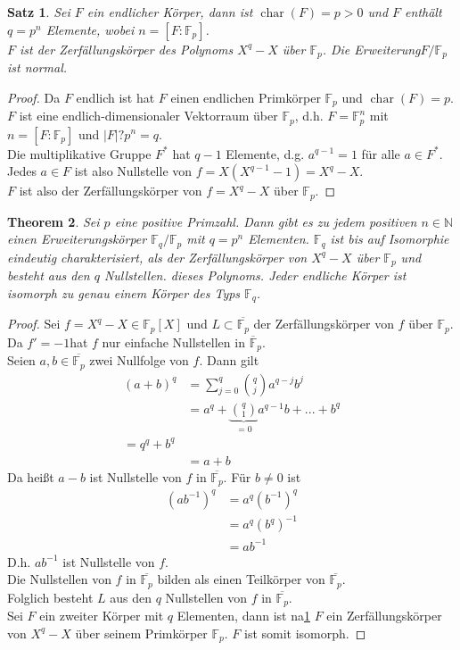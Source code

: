 \documentclass[10pt,a4paper]{article}
\newcommand{\N}{\ensuremath{\mathbb{N}}}
\newcommand{\F}{\ensuremath{\mathbb{F}}}
\newcommand{\ol}[1]{\overline{#1}}
\newcommand{\abs}[1]{\left|#1\right|}
\newcommand{\cha}{\operatorname{char}}
\theoremstyle{plain}
\newtheorem{theorem}{Theorem}[section]
\newtheorem{satz}[theorem]{Satz}
\theoremstyle{definition}
\theoremstyle{remark}
\begin{document}
	\begin{satz}\label{satz:primErweitEigenschaften}
		Sei $F$ ein endlicher Körper, dann ist $\cha(F)=p>0$ und $F$ enthält $q=p^n$ Elemente, wobei $n=[F:\F_p]$.\\
		$F$ ist der Zerfällungskörper des Polynoms $X^q-X$ über $\F_p$. Die Erweiterung$F/\F_p$ ist normal.
	\end{satz}
	\begin{proof}
		Da $F$ endlich ist hat $F$ einen endlichen Primkörper $\F_p$ und $\cha(F)=p$.\\
		$F$ ist eine endlich-dimensionaler Vektorraum über $\F_p$, d.h. $F=\F_p^n$ mit $n=[F:\F_p]$ und $\abs{F}?p^n=q$.\\
		Die multiplikative Gruppe $F^*$ hat $q-1$ Elemente, d.g. $a^{q-1}=1$ für alle $a\in F^*$.\\
		Jedes $a\in F$ ist also Nullstelle von $f=X(X^{q-1}-1)=X^q-X$.\\
		$F$ ist also der Zerfällungskörper von $f=X^q-X$ über $\F_p$.
	\end{proof}

	\begin{theorem}
		Sei $p$ eine positive Primzahl. Dann gibt es zu jedem positiven $n\in \N$ einen Erweiterungskörper $\F_q/\F_p$ mit $q=p^n$ Elementen. $\F_q$ ist bis auf Isomorphie eindeutig charakterisiert, als der Zerfällungskörper von $X^q-X$ über $\F_p$ und besteht aus den $q$ Nullstellen. dieses Polynoms. Jeder endliche Körper ist isomorph zu genau einem Körper des Typs $\F_q$.
	\end{theorem}
	\begin{proof}
		Sei $f=X^q-X\in \F_p[X]$ und $L\subset\ol{\F_p}$ der Zerfällungskörper von $f$ über $\F_p$.\\
		Da $f'=-1$hat $f$ nur einfache Nullstellen in $\ol{\F}_p$.\\
		Seien $a,b\in\ol{\F_p}$ zwei Nullfolge von $f$. Dann gilt
		\begin{align*}
		(a+b)^q&=\sum_{j=0}^{q}\binom{q}{j}a^{q-j}b^j\\
		&=a^q+\underbrace{\binom{q}{1}}_{=0}a^{q-1}b+...+b^q\\
		=q^q+b^q\\
		&=a+b
		\end{align*}
		Da heißt $a-b$ ist Nullstelle von $f$ in $\ol{\F_p}$. Für $b\neq 0$ ist
		\begin{align*}
		(ab^{-1})^{q}&=a^q(b^{-1})^q\\
		&=a^{q}(b^q)^{-1}\\
		&=ab^{-1}
		\end{align*}
		D.h. $ab^{-1}$ ist Nullstelle von $f$.\\
		Die Nullstellen von $f$ in $\ol{\F_p}$ bilden als einen Teilkörper von $\ol{\F_p}$.\\
		Folglich besteht $L$ aus den $q$ Nullstellen von $f$ in $\ol{\F_p}$.\\
		Sei $F$ ein zweiter Körper mit $q$ Elementen, dann ist na\ref{satz:primErweitEigenschaften} $F$ ein Zerfällungskörper von $X^q-X$ über seinem Primkörper $\F_p$. $F$ ist somit isomorph.
	\end{proof}
\end{document}
